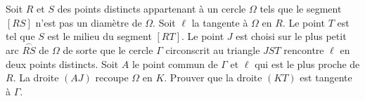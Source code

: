 Soit $R$ et $S$ des points distincts appartenant à un cercle $\Omega$ tels que le segment $[RS]$ n'est pas un
diamètre de $\Omega$. Soit $\ell$ la tangente à $\Omega$ en $R$. Le point $T$ est tel que $S$ est le milieu du
segment $[RT]$. Le point $J$ est choisi sur le plus petit arc $\overset{\frown}{RS}$ de $\Omega$ de sorte que
le cercle $\Gamma$ circonscrit au triangle $JST$ rencontre $\ell$ en deux points distincts. Soit $A$ le point
commun de $\Gamma$ et $\ell$ qui est le plus proche de $R$. La droite $(AJ)$ recoupe $\Omega$ en $K$. Prouver
que la droite $(KT)$ est tangente à $\Gamma$.
